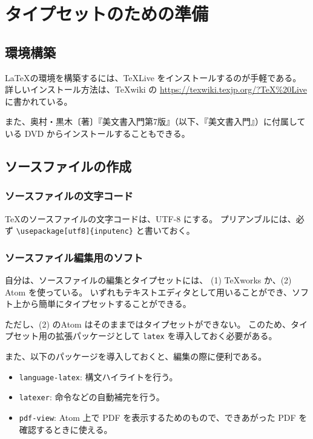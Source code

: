 \documentclass[ %
  uplatex,%
  a5paper,%
  papersize%
]{jsbook}
\begin{document}
\section{タイプセットのための準備}

\subsection{環境構築}

\LaTeX の環境を構築するには、\TeX Live をインストールするのが手軽である。
詳しいインストール方法は、\TeX wiki の 
\url{https://texwiki.texjp.org/?TeX%20Live} に書かれている。

また、奥村・黒木〔著〕『美文書入門第7版』（以下、『美文書入門』）に付属している DVD からインストールすることもできる。

\subsection{ソースファイルの作成}

\subsubsection{ソースファイルの文字コード}
\TeX のソースファイルの文字コードは、UTF-8 にする。
プリアンブルには、必ず \verb|\usepackage[utf8]{inputenc}| と書いておく。

\subsubsection{ソースファイル編集用のソフト}
自分は、ソースファイルの編集とタイプセットには、
(1) TeXworks か、(2) Atom を使っている。
いずれもテキストエディタとして用いることができ、ソフト上から簡単にタイプセットすることができる。

ただし、(2) のAtom はそのままではタイプセットができない。
このため、タイプセット用の拡張パッケージとして \texttt{latex} を導入しておく必要がある。

また、以下のパッケージを導入しておくと、編集の際に便利である。

\begin{itemize}
  \item \texttt{language-latex}: 構文ハイライトを行う。
  \item \texttt{latexer}: 命令などの自動補完を行う。
  \item \texttt{pdf-view}: Atom 上で PDF を表示するためのもので、できあがった PDF を確認するときに使える。
\end{itemize}
\end{document}
